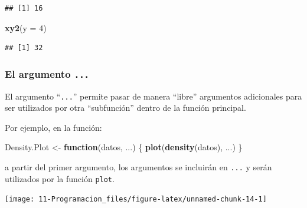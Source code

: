 \documentclass[]{book}
\newenvironment{Shaded}{\begin{snugshade}}{\end{snugshade}}
\newcommand{\KeywordTok}[1]{\textcolor[rgb]{0.13,0.29,0.53}{\textbf{#1}}}
\newcommand{\DataTypeTok}[1]{\textcolor[rgb]{0.13,0.29,0.53}{#1}}
\newcommand{\DecValTok}[1]{\textcolor[rgb]{0.00,0.00,0.81}{#1}}
\newcommand{\StringTok}[1]{\textcolor[rgb]{0.31,0.60,0.02}{#1}}
\newcommand{\ControlFlowTok}[1]{\textcolor[rgb]{0.13,0.29,0.53}{\textbf{#1}}}
\newcommand{\OperatorTok}[1]{\textcolor[rgb]{0.81,0.36,0.00}{\textbf{#1}}}
\newcommand{\NormalTok}[1]{#1}
\begin{document}
\begin{verbatim}
## [1] 16
\end{verbatim}

\begin{Shaded}
\begin{Highlighting}[]
\KeywordTok{xy2}\NormalTok{(}\DataTypeTok{y =} \DecValTok{4}\NormalTok{)}
\end{Highlighting}
\end{Shaded}

\begin{verbatim}
## [1] 32
\end{verbatim}

\subsubsection{\texorpdfstring{El argumento
\texttt{...}}{El argumento ...}}\label{el-argumento-...}

El argumento ``\texttt{...}'' permite pasar de manera ``libre''
argumentos adicionales para ser utilizados por otra ``subfunción''
dentro de la función principal.

Por ejemplo, en la función:

\begin{Shaded}
\begin{Highlighting}[]
\NormalTok{Density.Plot <-}\StringTok{ }\ControlFlowTok{function}\NormalTok{(datos, ...) \{ }\KeywordTok{plot}\NormalTok{(}\KeywordTok{density}\NormalTok{(datos), ...) \}}
\end{Highlighting}
\end{Shaded}

a partir del primer argumento, los argumentos se incluirán en
\texttt{...} y serán utilizados por la función \texttt{plot}.

\begin{Shaded}
\end{Shaded}

\begin{center}\texttt{[image: 11-Programacion\_files/figure-latex/unnamed-chunk-14-1]} \end{center}

\begin{Shaded}
\end{Shaded}
\end{document}
